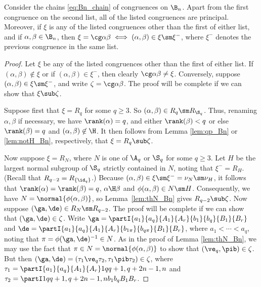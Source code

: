 %
\begin{proposition}\label{prop:chain_Bn}
Consider the chains \eqref{eq:Bn_chain} of congruences on $\B_n$.
%
Apart from the first congruence on the second list, all of the listed congruences are principal.  Moreover, if $\xi$ is any of the listed congruences other than the first of either list, and if $\alpha,\beta\in\B_n$, then $\xi=\cg\alpha\beta\iff(\alpha,\beta)\in\xi\sm\xi^-$, where $\xi^-$ denotes the previous congruence in the same list.
\end{proposition}

\begin{proof} Let $\xi$ be any of the listed congruences other than the first of either
list.  If $(\alpha,\beta)\not\in\xi$ or if $(\alpha,\beta)\in\xi^-$, then clearly
$\cg\alpha\beta\not=\xi$.  Conversely, suppose $(\alpha,\beta)\in\xi\sm\xi^-$, and write $\zeta=\cg\alpha\beta$.  The proof will be complete if we can show that $\xi\sub\zeta$.  

\bigskip{}  Suppose first that $\xi=R_q$ for some $q\geq3$.  So $(\alpha,\beta)\in R_q\sm R_{\S_q}$.  Thus, renaming $\alpha,\beta$ if necessary, we have $\rank(\alpha)=q$, and either $\rank(\beta)<q$ or else $\rank(\beta)=q$ and $(\alpha,\beta)\not\in{\H}$.  It then follows from Lemma \ref{lem:qp_Bn} or \ref{lem:notH_Bn}, respectively, that $\xi=R_q\sub\zeta$.

\bigskip{}  Now suppose $\xi=R_{N}$, where $N$ is one of $\A_q$ or $\S_q$ for some $q\geq3$.  Let $H$ be the largest normal subgroup of $\S_q$ strictly contained in $N$,
noting that $\xi^-=R_H$.  (Recall that $R_{q-2}=R_{\{\id_q\}}$.)  Because
$(\alpha,\beta)\in\xi\sm\xi^-=\nu_N\sm\nu_H$, it follows that $\rank(\alpha)=\rank(\beta)=q$,
$\alpha\H\beta$ and $\phi(\alpha,\beta)\in N\sm H$.  Consequently, we have
$N=\normal{\phi(\alpha,\beta)}$, so Lemma~\ref{lem:thN_Bn} gives $R_{q-2}\sub\zeta$.
Now suppose $(\ga,\de)\in R_N\sm R_{q-2}$.  The proof will be complete if we can show that $(\ga,\de)\in\zeta$.  Write $\ga=
\partI{a_1}{a_q}{A_1}{A_r}{b_1}{b_q}{B_1}{B_r}$ and $\de=\partI{a_1}{a_q}{A_1}{A_r}{b_{1\pi}}{b_{q\pi}}{B_1}{B_r}$, where $a_1<\cdots<a_q$, noting that $\pi=\phi(\ga,\de)^{-1}\in N$.  As in the proof of Lemma \ref{lem:thN_Bn}, we may use the fact that $\pi\in N=\normal{\phi(\alpha,\beta)}$ to show that $(\ve_q,\pib)\in\zeta$.  But then $(\ga,\de)=(\tau_1\ve_q\tau_2,\tau_1\pib\tau_2)\in\zeta$, where $\tau_1=\partI{a_1}{a_q}{A_1}{A_r}1q{q+1,q+2}{n-1,n}$ and $\tau_2=\partI1q{q+1,q+2}{n-1,n}{b_1}{b_q}{B_1}{B_r}$. \end{proof}





